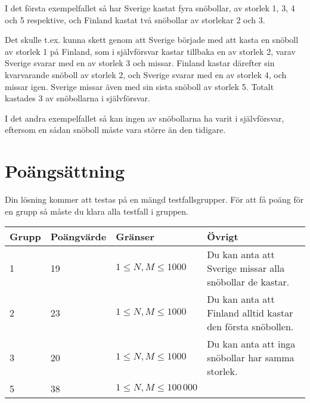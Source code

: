 I det första exempelfallet så har Sverige kastat fyra snöbollar, av storlek 1, 3, 4 och 5 respektive, och Finland kastat två snöbollar av storlekar 2 och 3.

Det skulle t.ex. kunna skett genom att Sverige började med att kasta en snöboll av storlek 1 på Finland, som i självförsvar kastar tillbaka en av storlek 2, varav Sverige svarar med en av storlek 3 och missar.
Finland kastar därefter sin kvarvarande snöboll av storlek 2, och Sverige svarar med en av storlek 4, och missar igen. Sverige missar även med sin sista snöboll av storlek 5. Totalt kastades 3 av snöbollarna i självförsvar.

I det andra exempelfallet så kan ingen av snöbollarna ha varit i självförsvar, eftersom en sådan snöboll måste vara större än den tidigare.

\section*{Poängsättning}

Din lösning kommer att testas på en mängd testfallsgrupper. För att få poäng för en grupp
så måste du klara alla testfall i gruppen.

\begin{tabular}{| l | l | l | l |}
\hline
Grupp & Poängvärde & Gränser & Övrigt \\ \hline
1     & 19         &  $1 \le N,M \le 1000$ & Du kan anta att Sverige missar alla snöbollar de kastar. \\ \hline
2     & 23         &  $1 \le N,M \le 1000$ & Du kan anta att Finland alltid kastar den första snöbollen. \\ \hline
3     & 20         &  $1 \le N,M \le 1000$ & Du kan anta att inga snöbollar har samma storlek. \\ \hline
5     & 38         &  $1 \le N,M \le 100\,000$ & \\ \hline
\end{tabular}
